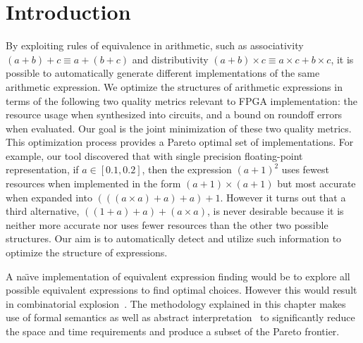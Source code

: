 \section{Introduction}
\label{sec:introduction}


By exploiting rules of equivalence in arithmetic, such as associativity $(a
+ b) + c \equiv a + (b + c)$ and distributivity $(a + b) \times c \equiv a
\times c + b \times c$, it is possible to automatically generate different
implementations of the same arithmetic expression.  We optimize the structures
of arithmetic expressions in terms of the following two quality metrics
relevant to FPGA implementation: the resource usage when synthesized into
circuits, and a bound on roundoff errors when evaluated. Our goal is the joint
minimization of these two quality metrics.  This optimization process provides
a Pareto optimal set of implementations.  For example, our tool discovered that
with single precision floating-point representation, if $a \in [0.1, 0.2]$,
then the expression ${(a + 1)}^2$ uses fewest resources when implemented in the
form $(a + 1) \times (a + 1)$ but most accurate when expanded into $(((a \times
a) + a) + a) + 1$.  However it turns out that a third alternative, $((1 + a)
+ a) + (a \times a)$, is never desirable because it is neither more accurate
nor uses fewer resources than the other two possible structures. Our aim is to
automatically detect and utilize such information to optimize the structure of
expressions.

A na{\"\i}ve implementation of equivalent expression finding would be to
explore all possible equivalent expressions to find optimal choices.  However
this would result in combinatorial explosion~\cite{ioualalen}.
The methodology explained in this chapter makes use of formal semantics as well
as abstract interpretation~\cite{cousot77} to significantly reduce the space
and time requirements and produce a subset of the Pareto frontier.


